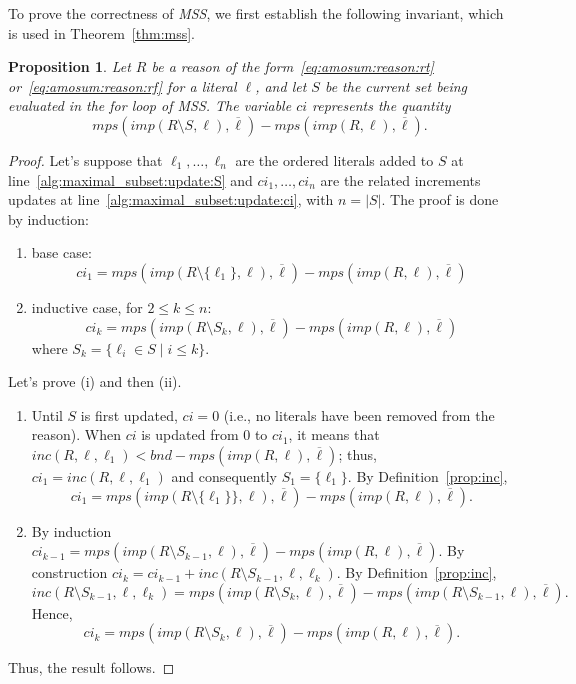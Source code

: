 \documentclass[preprint,authoryear]{elsarticle}
\newcommand{\inc}{\mathit{inc}}
\newcommand{\mps}{\mathit{mps}}
\newcommand{\bnd}{\mathit{bnd}}
\newtheorem{proposition}{Proposition}[section]
\theoremstyle{definition}
\begin{document}
{\color{blue}
To prove the correctness of \textit{MSS}, we first establish the following invariant, which is used in Theorem~\ref{thm:mss}.

\begin{proposition}
\label{prop:maximal_subset:ci}
    Let $R$ be a reason of the form~\eqref{eq:amosum:reason:rt} or~\eqref{eq:amosum:reason:rf} for a literal $\ell$, and let $S$ be the current set being evaluated in the for loop of \textit{MSS}. The variable $ci$ represents the quantity
    $$\mps(\mathit{imp}(R \setminus S, \ell), \overline{\ell}) - \mps(\mathit{imp}(R, \ell), \overline{\ell}).$$
\end{proposition}
\begin{proof}
    Let's suppose that $\ell_1, \dots, \ell_n$ are the ordered literals added to $S$ at line~\ref{alg:maximal_subset:update:S} and $ci_1, \dots, ci_n$ are the related increments updates at line~\ref{alg:maximal_subset:update:ci}, with $n = \vert S\vert$. The proof is done by induction:
    \begin{enumerate}
        \item[(i)] base case: $$ci_1 = \mps(\mathit{imp}(R \setminus \{\ell_1\}, \ell), \overline{\ell}) - \mps(\mathit{imp}(R, \ell), \overline{\ell})$$
        \item[(ii)] inductive case, for $2\le k \le n$: $$ci_k = \mps(\mathit{imp}(R \setminus S_k, \ell), \overline{\ell}) - \mps(\mathit{imp}(R, \ell), \overline{\ell})$$ where $S_k = \{\ell_i \in S \mid i \le k\}$.
    \end{enumerate}
    Let's prove (i) and then (ii).
    \begin{enumerate}
        \item[(i)] 
        Until $S$ is first updated, $ci = 0$ (i.e., no literals have been removed from the reason).
        When $ci$ is updated from $0$ to $ci_1$, it means that $\inc(R,\ell, \ell_1) < \bnd - \mps(\mathit{imp}(R, \ell), \overline{\ell})$; thus, $ci_1 = \inc(R, \ell,\ell_1)$ and consequently $S_1 = \{\ell_1\}$.
        By Definition~\ref{prop:inc}, $$ci_1 = \mps(\mathit{imp}({R \setminus \{\ell_1\} \}},\ell),\overline{\ell}) - \mps(\mathit{imp}(R,\ell),\overline{\ell}).$$
        \item[(ii)] By induction $ci_{k-1} = \mps(\mathit{imp}(R \setminus S_{k-1}, \ell), \overline{\ell}) - \mps(\mathit{imp}(R , \ell), \overline{\ell})$.
        By construction $ci_k = ci_{k-1} + \inc(R\setminus S_{k-1}, \ell, \ell_k).$
        By Definition~\ref{prop:inc}, $$\inc(R\setminus S_{k-1}, \ell, \ell_k) = \mps(\mathit{imp}({R \setminus S_k},\ell),\overline{\ell}) - \mps(\mathit{imp}(R \setminus S_{k-1},\ell),\overline{\ell}).$$
        Hence, $$ci_k = \mps(\mathit{imp}({R \setminus S_k},\ell),\overline{\ell}) - \mps(\mathit{imp}(R,\ell),\overline{\ell}).$$
    \end{enumerate}
    Thus, the 
    result follows.
\end{proof}

}
\end{document}
